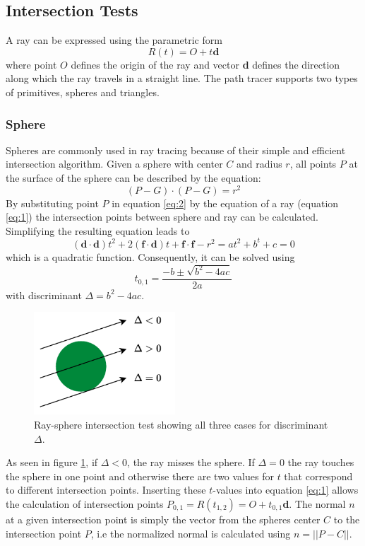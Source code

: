\subsection{Intersection Tests}
A ray can be expressed using the parametric form 
\begin{equation} \label{eq:1}
    R(t)=O+t\textbf{d}
\end{equation}
where point $O$ defines the origin of the ray and vector \textbf{d} defines the direction along which the ray travels in a straight line. The path tracer supports two types of primitives, spheres and triangles. 
\subsubsection{Sphere}
Spheres are commonly used in ray tracing because of their simple and efficient intersection algorithm\cite{haines2019}. Given a sphere with center $C$ and radius $r$, all points $P$ at the surface of the sphere can be described by the equation:
\begin{equation} \label{eq:2}
    (P-G)\cdot(P-G)=r^2
\end{equation}
By substituting point $P$ in equation \ref{eq:2} by the equation of a ray (equation \ref{eq:1}) the intersection points between sphere and ray can be calculated. Simplifying the resulting equation leads to 
\[
    (\textbf{d}\cdot\textbf{d})t^2+2(\textbf{f}\cdot\textbf{d})t+\textbf{f}\cdot\textbf{f}-r^2 = at^2+b^t+c = 0
\]
which is a quadratic function. Consequently, it can be solved using 
\[
    t_{0,1}=\frac{-b\pm\sqrt{b^2-4ac}}{2a}
\]
with discriminant $\Delta=b^2-4ac$.
\begin{figure}[H]
    \centering
    \includegraphics[width=150pt]{images/ray_sphere_intersection.pdf}
    \caption{Ray-sphere intersection test showing all three cases for discriminant $\Delta$.}
    \label{fig:sphere_intersec}
\end{figure}
As seen in figure \ref{fig:sphere_intersec}, if $\Delta<0$, the ray misses the sphere. If $\Delta=0$ the ray touches the sphere in one point and otherwise there are two values for $t$ that correspond to different intersection points. Inserting these $t$-values into equation \ref{eq:1} allows the calculation of intersection points $P_{0,1} = R(t_{1,2}) = O+t_{0,1}$\textbf{d}. The normal $n$ at a given intersection point is simply the vector from the spheres center $C$ to the intersection point $P$, i.e the normalized normal is calculated using $n=||P-C||$.

